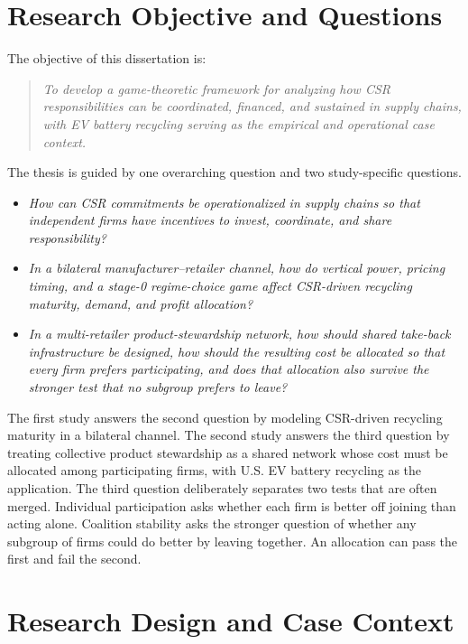 \section{Research Objective and Questions}
\label{sec:intro_objectives}

The objective of this dissertation is:

\begin{quote}
\emph{To develop a game-theoretic framework for analyzing how CSR responsibilities can be coordinated, financed, and sustained in supply chains, with EV battery recycling serving as the empirical and operational case context.}
\end{quote}

The thesis is guided by one overarching question and two study-specific questions.

\begin{itemize}
    \item \emph{How can CSR commitments be operationalized in supply chains so that independent firms have incentives to invest, coordinate, and share responsibility?}

    \item \emph{In a bilateral manufacturer--retailer channel, how do vertical power, pricing timing, and a stage-0 regime-choice game affect CSR-driven recycling maturity, demand, and profit allocation?}

    \item \emph{In a multi-retailer product-stewardship network, how should shared take-back infrastructure be designed, how should the resulting cost be allocated so that every firm prefers participating, and does that allocation also survive the stronger test that no subgroup prefers to leave?}
\end{itemize}

The first study answers the second question by modeling CSR-driven recycling maturity in a bilateral channel. The second study answers the third question by treating collective product stewardship as a shared network whose cost must be allocated among participating firms, with U.S. EV battery recycling as the application. The third question deliberately separates two tests that are often merged. Individual participation asks whether each firm is better off joining than acting alone. Coalition stability asks the stronger question of whether any subgroup of firms could do better by leaving together. An allocation can pass the first and fail the second.

\section{Research Design and Case Context}
\label{sec:intro_design}

